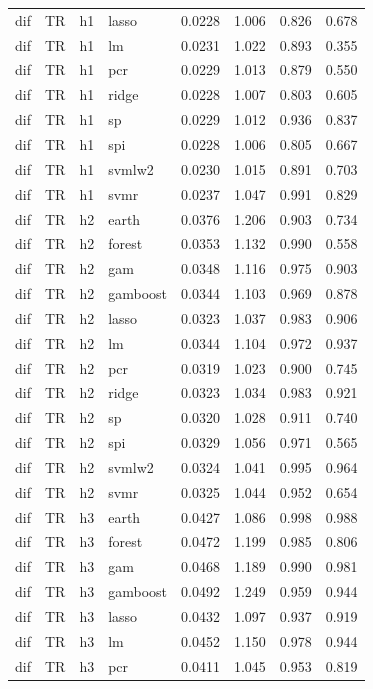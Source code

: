 \begin{ThreePartTable}
\begin{longtable}[t]{llclcccc}
dif & TR & h1 & lasso & 0.0228 & 1.006 & 0.826 & 0.678\\
dif & TR & h1 & lm & 0.0231 & 1.022 & 0.893 & 0.355\\
dif & TR & h1 & pcr & 0.0229 & 1.013 & 0.879 & 0.550\\
dif & TR & h1 & ridge & 0.0228 & 1.007 & 0.803 & 0.605\\
dif & TR & h1 & sp & 0.0229 & 1.012 & 0.936 & 0.837\\
dif & TR & h1 & spi & 0.0228 & 1.006 & 0.805 & 0.667\\
dif & TR & h1 & svmlw2 & 0.0230 & 1.015 & 0.891 & 0.703\\
dif & TR & h1 & svmr & 0.0237 & 1.047 & 0.991 & 0.829\\
\addlinespace
dif & TR & h2 & earth & 0.0376 & 1.206 & 0.903 & 0.734\\
dif & TR & h2 & forest & 0.0353 & 1.132 & 0.990 & 0.558\\
dif & TR & h2 & gam & 0.0348 & 1.116 & 0.975 & 0.903\\
dif & TR & h2 & gamboost & 0.0344 & 1.103 & 0.969 & 0.878\\
dif & TR & h2 & lasso & 0.0323 & 1.037 & 0.983 & 0.906\\
dif & TR & h2 & lm & 0.0344 & 1.104 & 0.972 & 0.937\\
dif & TR & h2 & pcr & 0.0319 & 1.023 & 0.900 & 0.745\\
dif & TR & h2 & ridge & 0.0323 & 1.034 & 0.983 & 0.921\\
dif & TR & h2 & sp & 0.0320 & 1.028 & 0.911 & 0.740\\
dif & TR & h2 & spi & 0.0329 & 1.056 & 0.971 & 0.565\\
dif & TR & h2 & svmlw2 & 0.0324 & 1.041 & 0.995 & 0.964\\
dif & TR & h2 & svmr & 0.0325 & 1.044 & 0.952 & 0.654\\
\addlinespace
dif & TR & h3 & earth & 0.0427 & 1.086 & 0.998 & 0.988\\
dif & TR & h3 & forest & 0.0472 & 1.199 & 0.985 & 0.806\\
dif & TR & h3 & gam & 0.0468 & 1.189 & 0.990 & 0.981\\
dif & TR & h3 & gamboost & 0.0492 & 1.249 & 0.959 & 0.944\\
dif & TR & h3 & lasso & 0.0432 & 1.097 & 0.937 & 0.919\\
dif & TR & h3 & lm & 0.0452 & 1.150 & 0.978 & 0.944\\
dif & TR & h3 & pcr & 0.0411 & 1.045 & 0.953 & 0.819\\

\end{longtable}
\end{ThreePartTable}
